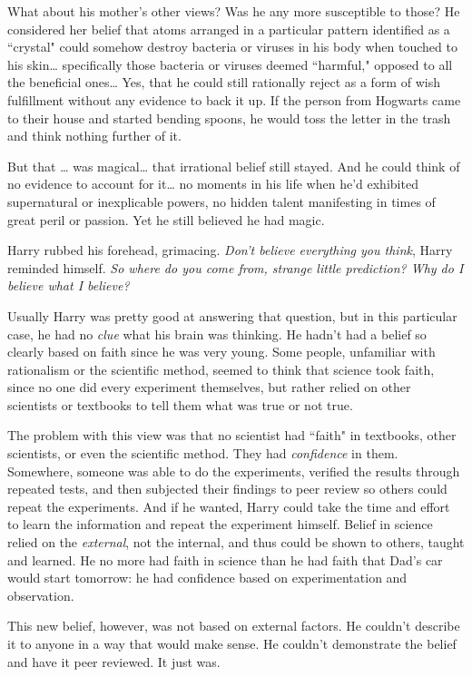 What about his mother's other views? Was he any more
susceptible to those? He considered her belief that atoms
arranged in a particular pattern identified as a ``crystal"
could somehow destroy bacteria or viruses in his body
when touched to his skin{\ldots} specifically those bacteria or
viruses deemed ``harmful," opposed to all the beneficial
ones{\ldots} Yes, that he could still rationally reject as a form of
wish fulfillment without any evidence to back it up. If the
person from Hogwarts came to their house and started
bending spoons, he would toss the letter in the trash and
think nothing further of it.

But that {\ldots} was magical{\ldots} that irrational belief still stayed.
And he could think of no evidence to account for it{\ldots} no
moments in his life when he'd exhibited supernatural or
inexplicable powers, no hidden talent manifesting in times
of great peril or passion. Yet he still believed he had magic.

Harry rubbed his forehead, grimacing. \emph{Don't believe
everything you think}, Harry reminded himself. \emph{So where
do you come from, strange little prediction? Why do I
believe what I believe?}

Usually Harry was pretty good at answering that question,
but in this particular case, he had no \emph{clue} what his brain
was thinking. He hadn't had a belief so clearly based on
faith since he was very young. Some people, unfamiliar
with rationalism or the scientific method, seemed to think
that science took faith, since no one did every experiment
themselves, but rather relied on other scientists or
textbooks to tell them what was true or not true.

The problem with this view was that no scientist had
``faith" in textbooks, other scientists, or even the scientific
method. They had \emph{confidence} in them. Somewhere,
someone was able to do the experiments, verified the
results through repeated tests, and then subjected their
findings to peer review so others could repeat the
experiments. And if he wanted, Harry could take the time
and effort to learn the information and repeat the
experiment himself. Belief in science relied on the \emph{external},
not the internal, and thus could be shown to others,
taught and learned. He no more had faith in science than
he had faith that Dad's car would start tomorrow: he had
confidence based on experimentation and observation.

This new belief, however, was not based on external
factors. He couldn't describe it to anyone in a way that
would make sense. He couldn't demonstrate the belief and
have it peer reviewed. It just was.

